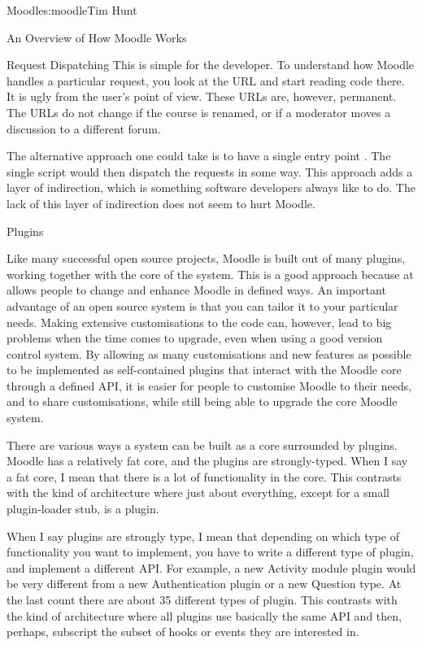 \begin{aosachapter}{Moodle}{s:moodle}{Tim Hunt}
\begin{aosasect1}{An Overview of How Moodle Works}
\begin{aosasect2}{Request Dispatching}
This is simple for the developer. To understand
how Moodle handles a particular request, you look at the URL and start
reading code there. It is ugly from the user's point of view. These
URLs are, however, permanent. The URLs do not change if the course is
renamed, or if a moderator moves a discussion to a different forum.

The alternative approach one could take is to have a single entry
point 
. The single script  would then dispatch
the requests in some way. This approach adds a layer of indirection,
which is something software developers always like to do. The lack of
this layer of indirection does not seem to hurt Moodle.

\end{aosasect2}

\begin{aosasect2}{Plugins}

Like many successful open source projects, Moodle is built out of many
plugins, working together with the core of the system. This is a good
approach because at allows people to change and enhance Moodle in
defined ways. An important advantage of an open source system is that
you can tailor it to your particular needs. Making extensive
customisations to the code can, however, lead to big problems when the
time comes to upgrade, even when using a good version control
system. By allowing as many customisations and new features as
possible to be implemented as self-contained plugins that interact
with the Moodle core through a defined API, it is easier for people to
customise Moodle to their needs, and to share customisations, while
still being able to upgrade the core Moodle system.

There are various ways a system can be built as a core surrounded by
plugins. Moodle has a relatively fat core, and the plugins are
strongly-typed. When I say a fat core, I mean that there is a lot of
functionality in the core. This contrasts with the kind of architecture
where just about everything, except for a small plugin-loader stub, is
a plugin.

When I say plugins are strongly type, I mean that depending on which
type of functionality you want to implement, you have to write a
different type of plugin, and implement a different API. For example,
a new Activity module plugin would be very different from a new
Authentication plugin or a new Question type. At the last count there
are about 35 different types of plugin. This contrasts with the kind
of architecture where all plugins use basically the same API and then,
perhaps, subscript the subset of hooks or events they are
interested in.


\end{aosasect2}
\end{aosasect1}
\end{aosachapter}
